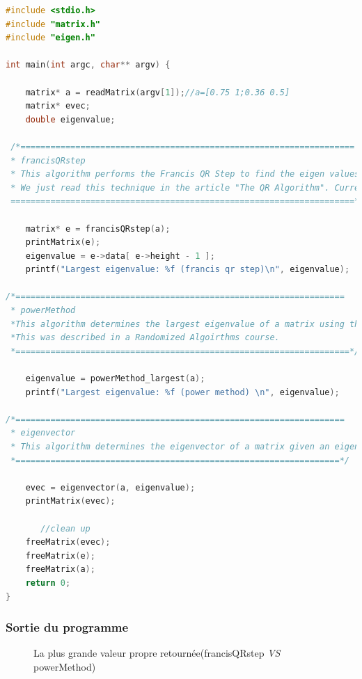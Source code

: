   \begin{lstlisting}[language=C++]
#include <stdio.h>
#include "matrix.h"
#include "eigen.h"

int main(int argc, char** argv) {

    matrix* a = readMatrix(argv[1]);//a=[0.75 1;0.36 0.5]
    matrix* evec;
    double eigenvalue; 
   
 /*===================================================================
 * francisQRstep
 * This algorithm performs the Francis QR Step to find the eigen values of a square matrix.
 * We just read this technique in the article "The QR Algorithm". Currently we have this method to test the approach.
 =====================================================================*/
    
    matrix* e = francisQRstep(a);
    printMatrix(e);
    eigenvalue = e->data[ e->height - 1 ];
    printf("Largest eigenvalue: %f (francis qr step)\n", eigenvalue);

/*==================================================================
 * powerMethod
 *This algorithm determines the largest eigenvalue of a matrix using the power method
 *This was described in a Randomized Algoirthms course.
 *===================================================================*/

    eigenvalue = powerMethod_largest(a);
    printf("Largest eigenvalue: %f (power method) \n", eigenvalue);
    
/*==================================================================
 * eigenvector
 * This algorithm determines the eigenvector of a matrix given an eigenvalue.
 *=================================================================*/
 
    evec = eigenvector(a, eigenvalue);
    printMatrix(evec);
    
       //clean up
    freeMatrix(evec);
    freeMatrix(e);
    freeMatrix(a);
    return 0;
} \end{lstlisting}



 \subsubsection{Sortie du programme}  
 
 \begin{figure}[ht]
	\centering
{}
	\label{fig:ex_Vreprest}
	\caption{La plus grande valeur propre retournée(francisQRstep \textit{VS} powerMethod)}
\end{figure}





